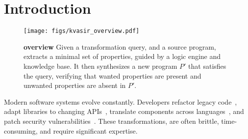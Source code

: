 \documentclass[a4paper,twoside,12pt]{report} %
\begin{document}

\pagecolor{white}
\pagestyle{empty}
\cleardoublepage 

\clearpage 
\pagestyle{main}

\clearpage 

\clearpage 

\cleardoublepage 
\tableofcontents
\cleardoublepage 


\chapter{Introduction}
\begin{figure}[t]
  \texttt{[image: figs/kvasir\_overview.pdf]}
  \caption{\textbf{\sys overview}
Given a transformation query, and a source program, \sys extracts a minimal set
  of properties,
  guided by a logic engine and knowledge base.
  It then synthesizes a new program $P'$ that satisfies the query, verifying
  that wanted properties are present and unwanted properties are absent in $P'$.
}
  \label{fig:overview}
\end{figure}





Modern software systems evolve constantly.
Developers refactor legacy code~\cite{Fowler99,Mens04,facebook2010redesigns,dropbox2014syncengine},
adapt libraries to changing APIs~\cite{dig2005role,kula2017empiricalstudyimpactrefactoring},
translate components across languages~\cite{manzoor_cli_python,gaultier_rewrite_cpp},
and patch security vulnerabilities~\cite{ikegami2022userefactoringsecurityvulnerability,schneier2013security_vulnerabilities}.
These transformations, are often brittle, time-consuming, and require significant expertise.
\end{document}
